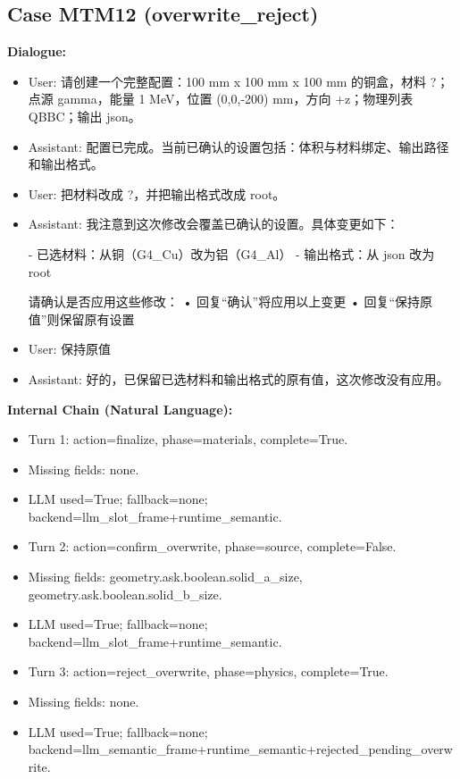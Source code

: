 \documentclass[11pt]{ctexart}
\begin{document}
\subsection{Case MTM12 (overwrite\_reject)}
\textbf{Dialogue:}
\begin{itemize}
\item User: 请创建一个完整配置：100 mm x 100 mm x 100 mm 的铜盒，材料 ?；点源 gamma，能量 1 MeV，位置 (0,0,-200) mm，方向 +z；物理列表 QBBC；输出 json。
\item Assistant: 配置已完成。当前已确认的设置包括：体积与材料绑定、输出路径和输出格式。
\item User: 把材料改成 ?，并把输出格式改成 root。
\item Assistant: 我注意到这次修改会覆盖已确认的设置。具体变更如下：

- 已选材料：从铜（G4\_Cu）改为铝（G4\_Al）
- 输出格式：从 json 改为 root

请确认是否应用这些修改：
• 回复“确认”将应用以上变更
• 回复“保持原值”则保留原有设置
\item User: 保持原值
\item Assistant: 好的，已保留已选材料和输出格式的原有值，这次修改没有应用。
\end{itemize}
\textbf{Internal Chain (Natural Language):}
\begin{itemize}
\item Turn 1: action=finalize, phase=materials, complete=True.
\item Missing fields: none.
\item LLM used=True; fallback=none; backend=llm\_slot\_frame+runtime\_semantic.
\item Turn 2: action=confirm\_overwrite, phase=source, complete=False.
\item Missing fields: geometry.ask.boolean.solid\_a\_size, geometry.ask.boolean.solid\_b\_size.
\item LLM used=True; fallback=none; backend=llm\_slot\_frame+runtime\_semantic.
\item Turn 3: action=reject\_overwrite, phase=physics, complete=True.
\item Missing fields: none.
\item LLM used=True; fallback=none; backend=llm\_semantic\_frame+runtime\_semantic+rejected\_pending\_overwrite.
\end{itemize}
\end{document}
